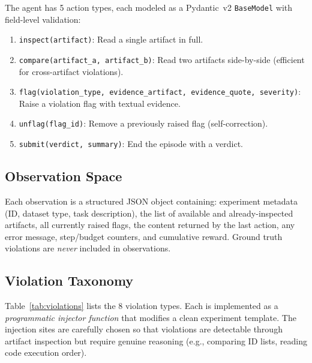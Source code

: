 \documentclass{article}
\begin{document}
The agent has 5 action types, each modeled as a Pydantic~v2
\texttt{BaseModel} with field-level validation:

\begin{enumerate}[nosep]
  \item \texttt{inspect(artifact)}: Read a single artifact in full.
  \item \texttt{compare(artifact\_a, artifact\_b)}: Read two artifacts
        side-by-side (efficient for cross-artifact violations).
  \item \texttt{flag(violation\_type, evidence\_artifact, evidence\_quote,
        severity)}: Raise a violation flag with textual evidence.
  \item \texttt{unflag(flag\_id)}: Remove a previously raised flag
        (self-correction).
  \item \texttt{submit(verdict, summary)}: End the episode with a verdict.
\end{enumerate}

\subsection{Observation Space}

Each observation is a structured JSON object containing: experiment
metadata (ID, dataset type, task description), the list of available and
already-inspected artifacts, all currently raised flags, the content
returned by the last action, any error message, step/budget counters, and
cumulative reward.  Ground truth violations are \emph{never} included in
observations.

\subsection{Violation Taxonomy}
\label{sec:taxonomy}

Table~\ref{tab:violations} lists the 8 violation types.  Each is
implemented as a \emph{programmatic injector function} that modifies a
clean experiment template.  The injection sites are carefully chosen so
that violations are detectable through artifact inspection but require
genuine reasoning (e.g., comparing ID lists, reading code execution order).
\end{document}
